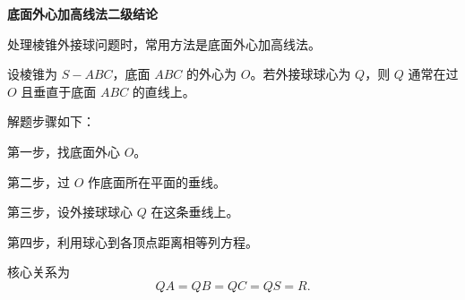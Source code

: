 \textbf{底面外心加高线法二级结论}

处理棱锥外接球问题时，常用方法是底面外心加高线法。

设棱锥为 $S-ABC$，底面 $ABC$ 的外心为 $O$。若外接球球心为 $Q$，则 $Q$ 通常在过 $O$ 且垂直于底面 $ABC$ 的直线上。

解题步骤如下：

第一步，找底面外心 $O$。

第二步，过 $O$ 作底面所在平面的垂线。

第三步，设外接球球心 $Q$ 在这条垂线上。

第四步，利用球心到各顶点距离相等列方程。

核心关系为
\[
QA=QB=QC=QS=R.
\]